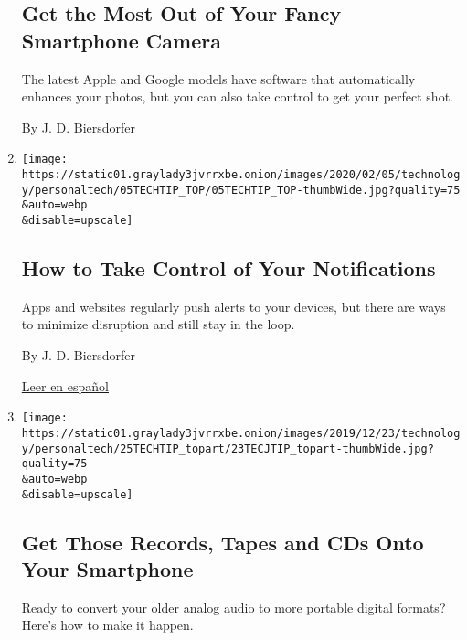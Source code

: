 \begin{enumerate}
  \hypertarget{get-the-most-out-of-your-fancy-smartphone-camera}{%
  \subsection{Get the Most Out of Your Fancy Smartphone
  Camera}\label{get-the-most-out-of-your-fancy-smartphone-camera}}

  The latest Apple and Google models have software that automatically
  enhances your photos, but you can also take control to get your
  perfect shot.

  By J. D. Biersdorfer
\item
  \href{/2020/02/05/technology/personaltech/control-phone-notifications.html}{}

  \texttt{[image: https://static01.graylady3jvrrxbe.onion/images/2020/02/05/technology/personaltech/05TECHTIP\_TOP/05TECHTIP\_TOP-thumbWide.jpg?quality=75\\\&auto=webp\\\&disable=upscale]}

  \hypertarget{how-to-take-control-of-your-notifications}{%
  \subsection{How to Take Control of Your
  Notifications}\label{how-to-take-control-of-your-notifications}}

  Apps and websites regularly push alerts to your devices, but there are
  ways to minimize disruption and still stay in the loop.

  By J. D. Biersdorfer

  \href{https://www.nytimes3xbfgragh.onion/es/2020/02/07/espanol/ciencia-y-tecnologia/como-eliminar-notificaciones.html}{Leer
  en español}
\item
  \href{/2019/12/25/technology/personaltech/digitize-analog-audio.html}{}

  \texttt{[image: https://static01.graylady3jvrrxbe.onion/images/2019/12/23/technology/personaltech/25TECHTIP\_topart/23TECJTIP\_topart-thumbWide.jpg?quality=75\\\&auto=webp\\\&disable=upscale]}

  \hypertarget{get-those-records-tapes-and-cds-onto-your-smartphone}{%
  \subsection{Get Those Records, Tapes and CDs Onto Your
  Smartphone}\label{get-those-records-tapes-and-cds-onto-your-smartphone}}

  Ready to convert your older analog audio to more portable digital
  formats? Here's how to make it happen.


\end{enumerate}
